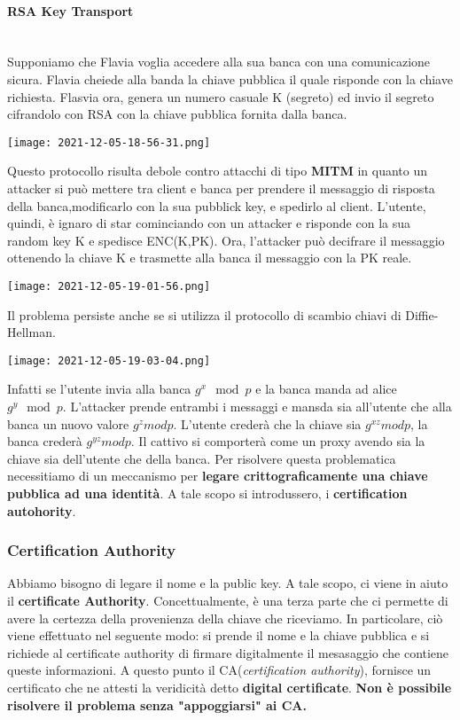 \documentclass{article}
\theoremstyle{remark}
\begin{document}
\paragraph{RSA Key Transport}\mbox{}\\
Supponiamo che Flavia voglia accedere alla sua banca con una comunicazione sicura. Flavia cheiede alla banda la chiave pubblica il quale risponde con la chiave richiesta. Flasvia ora, genera un numero casuale K (segreto) ed invio il segreto cifrandolo con RSA con la chiave pubblica fornita dalla banca.
\begin{center}
	\texttt{[image: 2021-12-05-18-56-31.png]}
\end{center}
Questo protocollo risulta debole contro attacchi di tipo \textbf{MITM} in quanto un attacker si può mettere tra client e banca per prendere il messaggio di risposta della banca,modificarlo con la sua pubblick key, e spedirlo al client. L'utente, quindi, è ignaro di star cominciando con un attacker e risponde con la sua random key K e spedisce ENC(K,PK). Ora, l'attacker può decifrare il messaggio ottenendo la chiave K e trasmette alla banca il messaggio con la PK reale.
\begin{center}
	\texttt{[image: 2021-12-05-19-01-56.png]}
\end{center}
Il problema persiste anche se si utilizza il protocollo di scambio chiavi di Diffie-Hellman.
\begin{center}
	\texttt{[image: 2021-12-05-19-03-04.png]}
\end{center}
Infatti se l'utente invia alla banca \(g^x \mod{p}\) e la banca manda ad alice \(g^y \mod{p}\). L'attacker prende entrambi i messaggi e mansda sia all'utente che alla banca un nuovo valore \(g^z mod p\). L'utente crederà che la chiave sia \(g^{xz}mod p\), la banca crederà \(g^{yz}mod p\). Il cattivo si comporterà come un proxy avendo sia la chiave sia dell'utente che della banca.\newline
Per risolvere questa problematica necessitiamo di un meccanismo per \textbf{legare crittograficamente una chiave pubblica ad una identità}. A tale scopo si introdussero, i \textbf{certification autohority}.\
\subsubsection{Certification Authority}
Abbiamo bisogno di legare il nome e la public key. A tale scopo, ci viene in aiuto il \textbf{certificate Authority}. Concettualmente, è una terza parte che ci permette di avere la certezza della provenienza della chiave che riceviamo. In particolare, ciò viene effettuato nel seguente modo: si prende il nome e la chiave pubblica e si richiede al certificate authority di firmare digitalmente il mesasaggio che contiene queste informazioni. A questo punto il CA(\emph{certification authority}), fornisce un certificato che ne attesti la veridicità detto \textbf{digital certificate}.\newline
\textbf{Non è possibile risolvere il problema senza "appoggiarsi" ai CA.}\newline
\end{document}
